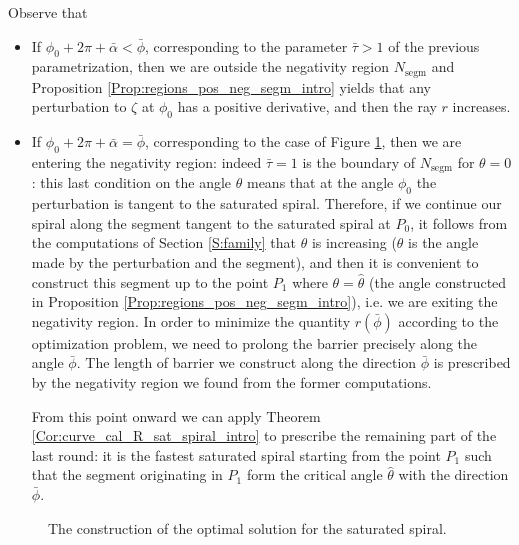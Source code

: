 \documentclass[reqno]{amsart}
\theoremstyle{definition} \newtheorem{definition}{Definition}[section]
\theoremstyle{definition} \newtheorem{remark}[definition]{Remark}
\theoremstyle{plain} \newtheorem{lemma}[definition]{Lemma}
\theoremstyle{plain} \newtheorem{proposition}[definition]{Proposition}
\theoremstyle{plain} \newtheorem{theorem}[definition]{Theorem}
\theoremstyle{plain} \newtheorem{corollary}[definition]{Corollary}
\theoremstyle{definition} \newtheorem{example}[definition]{Example}
\theoremstyle{plain} \newtheorem{claim}[clai]{Claim}
\theoremstyle{definition} \newtheorem{assumption}[definition]{Assumption}
\theoremstyle{definition} \newtheorem{observation}[definition]{Observation}
\newcommand{\1}{\mathbbm 1}
\numberwithin{equation}{section} %
\theoremstyle{plain} \newtheorem*{theorem*}{Theorem}
\theoremstyle{plain} \newtheorem{mthm}[maintheorem]{Main Theorem}
\theoremstyle{plain} \newtheorem*{mthm*}{Main Theorem}
\theoremstyle{plain} \newtheorem*{conjecture*}{Conjecture}
\theoremstyle{plain} \newtheorem{conjecture}[definition]{Conjecture}
\theoremstyle{plain} \newtheorem*{problem*}{Problem}
\begin{document}
\medskip
Observe that
\begin{itemize}
\item If $\phi_0 + 2\pi + \bar \alpha < \bar \phi$, corresponding to the parameter $\bar\tau>1$ of the previous parametrization, then we are  outside the negativity region $N_\mathrm{segm}$ and Proposition \ref{Prop:regions_pos_neg_segm_intro} yields that any perturbation to $\zeta$ at $\phi_0$ has a positive derivative, and then the ray $r$ increases.
\item  If $\phi_0+2\pi+\bar\alpha=\bar\phi$, corresponding to the case of Figure \ref{Fig:optimal_intro}, then we are entering the negativity region: indeed $\bar\tau = 1$ is the boundary of $N_\mathrm{segm}$ for $\theta = 0$: this last condition on the angle $\theta$ means that at the angle $\phi_0$ the perturbation is tangent to the saturated spiral. Therefore, if we continue our spiral along the segment tangent to the saturated spiral at $P_0$, it follows from the computations of Section \ref{S:family} that $\theta$ is increasing ($\theta$ is the angle made by the perturbation and the segment), and then it is convenient to construct this segment up to the point $P_1$ where $\theta = \hat \theta$ (the angle constructed in Proposition \ref{Prop:regions_pos_neg_segm_intro}), i.e. we are exiting the negativity region.   In order to minimize the quantity $r(\bar\phi)$ according to the optimization problem, we need to prolong the barrier precisely along the angle $\bar\phi$. The length of barrier we construct along the direction $\bar\phi$ is prescribed by the negativity region we found from the former computations.

From this point onward we can apply Theorem \ref{Cor:curve_cal_R_sat_spiral_intro} to prescribe the remaining part of the last round: it is the fastest saturated spiral starting from the point $P_1$ such that the segment originating in $P_1$ form the critical angle $\hat \theta$ with the direction $\bar \phi$.
\end{itemize}






\begin{figure}
\resizebox{.75\textwidth}{!}{}
\caption{The construction of the optimal solution for the saturated spiral.}
\label{Fig:optimal_intro}
\end{figure}


 
\end{document}
